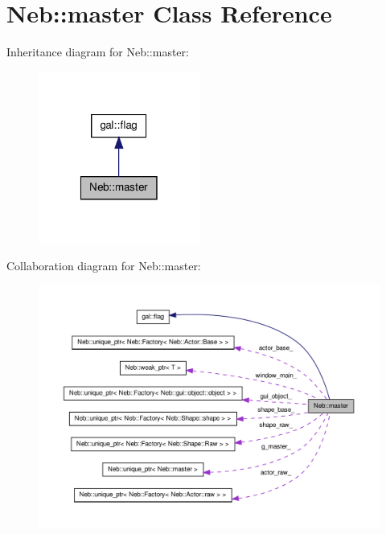 \hypertarget{classNeb_1_1master}{\section{\-Neb\-:\-:master \-Class \-Reference}
\label{classNeb_1_1master}
}


\-Inheritance diagram for \-Neb\-:\-:master\-:\nopagebreak
\begin{figure}[H]
\begin{center}
\leavevmode
\includegraphics[width=150pt]{classNeb_1_1master__inherit__graph}
\end{center}
\end{figure}


\-Collaboration diagram for \-Neb\-:\-:master\-:\nopagebreak
\begin{figure}[H]
\begin{center}
\leavevmode
\includegraphics[width=350pt]{classNeb_1_1master__coll__graph}
\end{center}
\end{figure}
